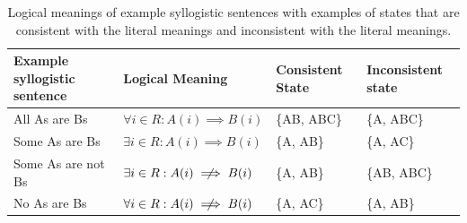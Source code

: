 \documentclass[floatsintext, doc]{apa6}
\begin{document}
\begin{table}[b]
\begin{tabular}{@{}llll@{}}
\toprule
Example syllogistic sentence & Logical Meaning                                                                       & Consistent State & Inconsistent state \\ \midrule
All As are Bs                                      & $\forall i \in R: A(i) \implies B(i) $ & \{AB, ABC\}                           & \{A, ABC\}                              \\
Some As are Bs                                     & $\exists i \in R: A(i) \implies B(i) $ & \{A, AB\}                             & \{A, AC\}                               \\
Some As are not Bs                                 & $\exists i \in R: A(i)  \centernot \implies B(i) $ & \{A, AB\}                             & \{AB, ABC\}                             \\
No As are Bs                                       & $\forall i \in R: A(i) \centernot \implies B(i) $  & \{A, AC\}                             & \{A, AB\} \\ \bottomrule
\end{tabular}
\caption{Logical meanings of example syllogistic sentences with examples of states that are consistent with the literal meanings and inconsistent with the literal meanings.}
\label{tab:sem}
\end{table}
\end{document}
